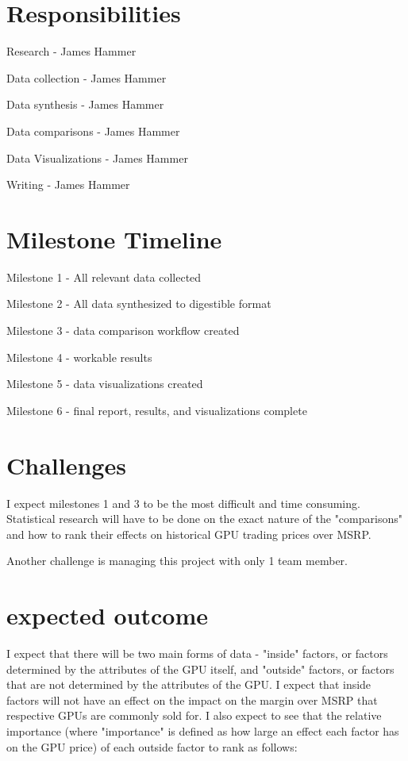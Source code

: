 \documentclass[letterpaper, 10 pt, conference]{ieeeconf}  %
\begin{document}
\section{Responsibilities}
Research - James Hammer

Data collection - James Hammer

Data synthesis - James Hammer

Data comparisons - James Hammer

Data Visualizations - James Hammer

Writing - James Hammer

\section{Milestone Timeline}
Milestone 1 - All relevant data collected

Milestone 2 - All data synthesized to digestible format

Milestone 3 - data comparison workflow created

Milestone 4 - workable results

Milestone 5 - data visualizations created

Milestone 6 - final report, results, and visualizations complete

\section{Challenges}
I expect milestones 1 and 3 to be the most difficult and time consuming. Statistical research will have to be done on the exact nature of the "comparisons" and how to rank their effects on historical GPU trading prices over MSRP. 

Another challenge is managing this project with only 1 team member. 

\section{expected outcome}
I expect that there will be two main forms of data - "inside" factors, or factors determined by the attributes of the GPU itself, and "outside" factors, or factors that are not determined by the attributes of the GPU. I expect that inside factors will not have an effect on the impact on the margin over MSRP that respective GPUs are commonly sold for. I also expect to see that the relative importance (where "importance" is defined as how large an effect each factor has on the GPU price) of each outside factor to rank as follows:
\end{document}
